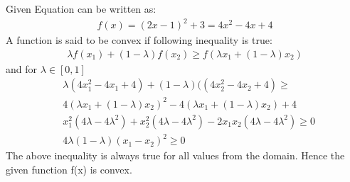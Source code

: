 Given Equation can be written as:
\begin{align}
    f(x)=(2x-1)^2+3=4x^2-4x+4
\end{align}
   A function is said to be convex if following inequality is true:
    \begin{align}
        \lambda f(x_1)+(1-\lambda) f(x_2) \geq f(\lambda x_1+(1-\lambda) x_2)
    \end{align}
    and for $\lambda \in [0,1]$
\begin{align}
&\lambda(4x_1^2-4x_1+4)+(1-\lambda)((4x_2^2-4x_2+4) \geq \nonumber \\ 
&4(\lambda x_1 +(1-\lambda )x_2)^2-4(\lambda x_1 +(1-\lambda )x_2)+4\\
&x_1^2(4\lambda-4\lambda^2)+x_2^2(4\lambda-4\lambda^2)-2x_1x_2(4\lambda-4\lambda^2) \geq 0\\
&4\lambda(1-\lambda)(x_1-x_2)^2 \geq 0
\end{align}
The above inequality is always true for all values from the domain. Hence the given function f(x) is convex.


